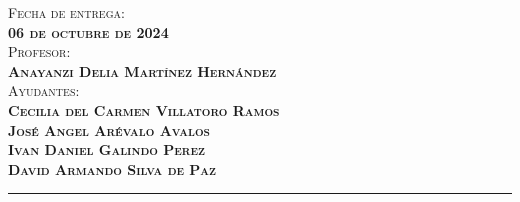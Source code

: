 \begin{titlepage}
\begin{center}
                \textsc{{Fecha de entrega: \\ \textbf{06 de octubre de 2024}}}\\[0.5cm]        

                \textsc{{Profesor: \\ \textbf{ Anayanzi Delia Martínez Hernández}}}\\[0.5cm]  

                \textsc{Ayudantes: \\\textbf{Cecilia del Carmen Villatoro Ramos \\
                José Angel Arévalo Avalos \\
                Ivan Daniel Galindo Perez \\
                David Armando Silva de Paz}}
    \end{center}
    
    \vfill
    
    \begin{center}
        \rule{17cm}{0.1mm}
    \end{center}
    
\end{titlepage}
\restoregeometry %